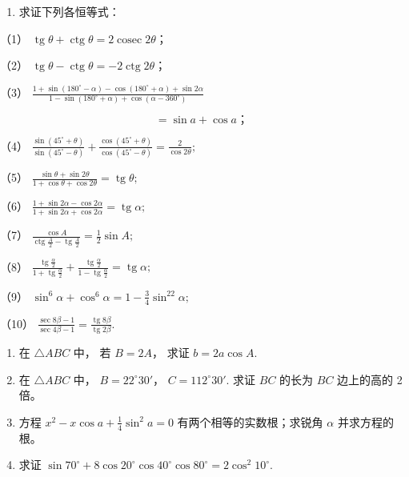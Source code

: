 \begin{enumerate}[start=7]
\item
  求证下列各恒等式：
\end{enumerate}

（1）
\(\operatorname{tg}\theta+\operatorname{ctg}\theta=2\operatorname{cosec}2\theta\)；

（2）
\(\operatorname{tg} \theta - \operatorname{ctg} \theta = -2 \operatorname{ctg} 2\theta\)；

（3）
\(\frac{1 + \sin(180^{\circ} - \alpha) - \cos(180^{\circ} + \alpha) + \sin 2\alpha}{1 - \sin(180^{\circ} + \alpha) + \cos(\alpha - 360^{\circ})}\)

\[
= \sin a + \cos a\text{；}
\]

（4）
\(\frac{\sin(45^{\circ} + \theta)}{\sin(45^{\circ} - \theta)} + \frac{\cos(45^{\circ} + \theta)}{\cos(45^{\circ} - \theta)} = \frac{2}{\cos 2\theta};\)

（5）
\(\frac{\sin\theta + \sin 2\theta}{1 + \cos\theta + \cos 2\theta} = \operatorname{tg}\theta;\)

（6）
\(\frac{1 + \sin 2\alpha - \cos 2\alpha}{1 + \sin 2\alpha + \cos 2\alpha} = \operatorname{tg} \alpha;\)

（7）
\(\frac{\cos A}{\operatorname{ctg}\frac{A}{2} - \operatorname{tg}\frac{A}{2}} = \frac{1}{2}\sin A;\)

（8）
\(\frac{\operatorname{tg}\frac{\alpha}{2}}{1 + \operatorname{tg}\frac{\alpha}{2}} + \frac{\operatorname{tg}\frac{\alpha}{2}}{1 - \operatorname{tg}\frac{\alpha}{2}} = \operatorname{tg}\alpha;\)

（9） \(\sin^6\alpha+\cos^6\alpha = 1 - \frac{3}{4}\sin^22\alpha ;\)

（10）
\(\frac{\sec 8\beta - 1}{\sec 4\beta - 1} = \frac{\operatorname{tg} 8\beta}{\operatorname{tg} 2\beta}\).

\begin{enumerate}[start=8]
\item
  在 \(\triangle ABC\) 中， 若 \(B = 2A\)， 求证 \(b = 2a \cos A\).
\item
  在 \(\triangle ABC\) 中， \(B = 22^{\circ}30'\)，
  \(C = 112^{\circ}30'\). 求证 \(BC\) 的长为 \(BC\) 边上的高的 2 倍。
\item
  方程 \(x^{2} - x \cos a + \frac{1}{4} \sin^{2} a = 0\)
  有两个相等的实数根；求锐角 \(\alpha\) 并求方程的根。
\item
  求证
  \(\sin 70^{\circ} + 8\cos 20^{\circ}\cos 40^{\circ}\cos 80^{\circ} = 2\cos^{2}10^{\circ}\).
\end{enumerate}

